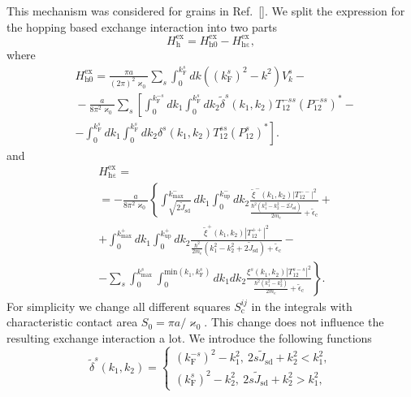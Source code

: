 \documentclass[aps,prb,amsmath,amssymb,twocolumn,superscriptaddress,showpacs,floatfix]{revtex4-1}
\begin{document}
This mechanism was considered for grains in Ref.~[]. We split the expression for the hopping based exchange interaction into two parts
\begin{equation}\label{Eq:ExFin}
H^\mathrm{ex}_\mathrm h=H^\mathrm{ex}_\mathrm{h0}-H^\mathrm{ex}_\mathrm{h\varepsilon},
\end{equation}
where
\begin{equation}\label{Eq:ExHop0}
\begin{split}
&H^{\mathrm{ex}}_{\mathrm{h0}}\!=\frac{\pi a}{(2\pi)^2\varkappa_0}\!\sum_{s}\!\int^{k_\mathrm F^s}_0\!\!dk (\!(k^s_\mathrm F)^2-k^2)V^s_{k}-\\
&\!-\frac{ a}{8\pi^2\varkappa_0}\sum_s\left[\int^{k^{-s}_\mathrm F}_{0}\!\!\!\!dk_1\!\!\!\int^{k^s_\mathrm F}_0\!\!\!\!\!\!dk_2 \tilde \delta^s(k_1,k_2)T^{-ss}_{12}(P_{12}^{-ss})^*-\right.\\
&-\left.\int^{k^s_\mathrm{F}}_{0}\!\!\!\!dk_1\int^{k^s_\mathrm{F}}_0\!\!dk_2 \delta^s(k_1,k_2) T^{ss}_{12}(P^s_{12})^*\right].
\end{split}
\end{equation}
and
\begin{equation}\label{Eq:ExHop1}
\begin{split}
&H^{\mathrm{ex}}_{\mathrm{h\varepsilon}}\!=\\&=-\frac{a}{8\pi^2\varkappa_0}\left\{\int^{k^-_\mathrm{max}}_{\sqrt{2\tilde J_\mathrm{sd}}}\!\!\!\!dk_1\int^{k^-_\mathrm{up}}_0\!\!\!\!\!\!dk_2\right.\frac{\tilde\xi^-(k_1,k_2)|T^{--}_{12}|^2}{\frac{\hbar^2(k_1^2-k_2^2-2\tilde J_\mathrm{sd})}{2m_\mathrm e}+\tilde \epsilon_\mathrm c}+\\
&+\!\!\!\int^{k^+_\mathrm{max}}_{0}\!\!\!\!dk_1\!\!\!\int^{k^+_\mathrm{up}}_0\!\!\!\!\!\!dk_2\frac{\tilde\xi^+(k_1,k_2)| T^{++}_{12}|^2}{\frac{\hbar^2}{2m_\mathrm e}(k_1^2-k_2^2+2\tilde J_\mathrm{sd})+\tilde \epsilon_\mathrm c}-\\
&-\!\sum_s\int^{k^s_\mathrm{max}}_{0}\!\!\!\!\int^{\mathrm{min}(k_1,k_\mathrm F^s)}_0\!\!\!\!\!\!dk_1 dk_2\left.\frac{\xi^s(k_1,k_2)|T^{s-s}_{12}|^2}{\frac{\hbar^2(k_1^2-k_2^2)}{2m_\mathrm e}+\tilde \epsilon_\mathrm c}\right\}.
\end{split}
\end{equation}
For simplicity we change all different squares $S_\mathrm c^{ij}$ in the
integrals with characteristic contact area $S_0=\pi a/\varkappa_0$. This change
does not influence the resulting exchange interaction a lot.
We introduce the following functions
\begin{equation}\label{Eq:AuxFunc3}
\tilde \delta^s(k_1,k_2)=\left\{\begin{array}{l} (k^{-s}_\mathrm F)^2-k^2_1,~2s\tilde J_{\mathrm{sd}}+k^2_2<k^2_1,\\
(k^s_\mathrm F)^2-k^2_2,~2s\tilde J_{\mathrm{sd}}+k^2_2>k^2_1,~\end{array}\right.
\end{equation}
\end{document}
